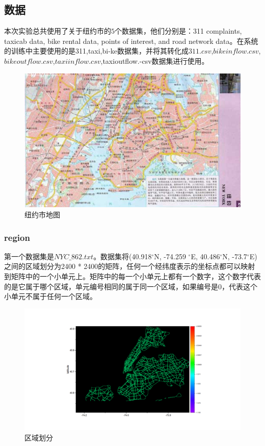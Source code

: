 \documentclass[a4paper, UTF8]{article}
\begin{document}
\begin{CJK}{UTF8}{gbsn}
\subsection{数据}
本次实验总共使用了关于纽约市的$5$个数据集，他们分别是：311 complaints, taxicab data, bike rental data, points of interest, and road network data。在系统的训练中主要使用的是311,taxi,bi-ke数据集，并将其转化成$311.csv$,$bikeinflow.csv$,$bikeoutflow.csv$,$taxiinflow.csv$,taxioutflow.-csv数据集进行使用。
\begin{figure}[ht]
\includegraphics[scale = 0.4]{nyc.jpg}
\centering
\caption{纽约市地图}
\label{nyc}
\end{figure}
\subsubsection*{region}
第一个数据集是$NYC\_862.txt$。数据集将(40.918$^{\circ}$N, -74.259 $^{\circ}$E, 40.486$^{\circ}$N, -73.7$^{\circ}$E)之间的区域划分为2400 * 2400的矩阵，任何一个经纬度表示的坐标点都可以映射到矩阵中的一个小单元上。矩阵中的每一个小单元上都有一个数字，这个数字代表的是它属于哪个区域，单元编号相同的属于同一个区域，如果编号是0，代表这个小单元不属于任何一个区域。
\begin{figure}[ht]
\includegraphics[scale = 0.4]{region.png}
\centering
\caption{区域划分}
\label{figure2}
\end{figure}

\end{CJK}
\end{document}
